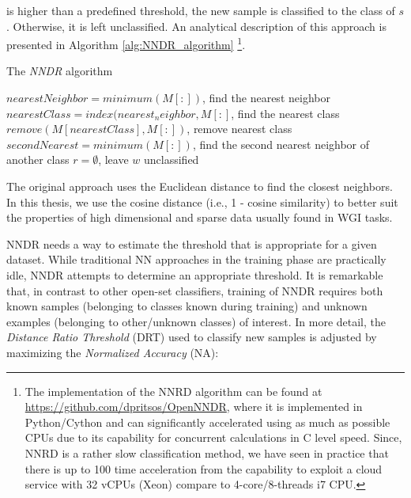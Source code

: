 \nointend is higher than a predefined threshold, the new sample is classified to the class of $s$. Otherwise, it is left unclassified. An analytical description of this approach is presented in Algorithm \ref{alg:NNDR_algorithm} \footnote{The implementation of the NNRD algorithm can be found at \url{https://github.com/dpritsos/OpenNNDR}, where it is implemented in Python/Cython and can significantly accelerated using as much as possible CPUs due to its capability for concurrent calculations in C level speed. Since, NNRD is a rather slow classification method, we have seen in practice that there is up to 100 time acceleration from the capability to exploit a cloud service with 32 vCPUs (Xeon) compare to 4-core/8-threads i7 CPU.}. 

\begin{algorithm}[t]
\caption{The \textit{NNDR} algorithm}
\label{alg:NNDR_algorithm}

$nearestNeighbor = minimum(M[:])$, find the nearest neighbor\;
$nearestClass = index(nearest_neighbor, M[:]$, find the nearest class\;
$remove(M[nearestClass],M[:])$, remove nearest class\;
$secondNearest = minimum(M[:])$, find the second nearest neighbor of another class\;
    {$r = \emptyset$, leave $w$ unclassified\;}

\end{algorithm}

The original approach uses the Euclidean distance to find the closest neighbors. In this thesis, we use the cosine distance (i.e., 1 - cosine similarity) to better suit the properties of high dimensional and sparse data usually found in WGI tasks. 

NNDR needs a way to estimate the threshold that is appropriate for a given dataset. While traditional NN approaches in the training phase are practically idle, NNDR attempts to determine an appropriate threshold. It is remarkable that, in contrast to other open-set classifiers, training of NNDR requires both known samples (belonging to classes known during training) and unknown examples (belonging to other/unknown classes) of interest. In more detail, the \textit{Distance Ratio Threshold} (DRT) used to classify new samples is adjusted by maximizing the \textit{Normalized Accuracy} (NA):

